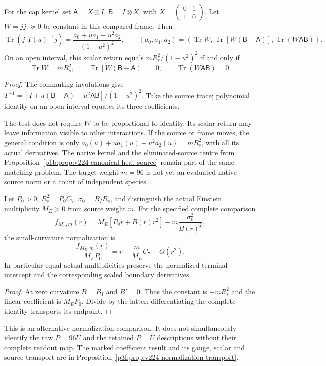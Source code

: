\documentclass[12pt,a4paper]{article}
\begin{document}
\begin{proposition}
\label{p3e:prop:v224-source-moments}
For the cap kernel set $\mathsf A=X\otimes I$,
$\mathsf B=I\otimes X$, with
$X=\left(\begin{smallmatrix}0&1\\1&0\end{smallmatrix}\right)$.
Let $W=jj^\dagger\succeq0$ be constant in this compared frame. Then
\[
 \operatorname{Tr}(j^\dagger T(u)^{-1}j)
 =\frac{a_0+ua_1-u^2a_2}{(1-u^2)^2},\qquad
 (a_0,a_1,a_2)=
 (\operatorname{Tr}W,\operatorname{Tr}[W(\mathsf B-\mathsf A)],
                              \operatorname{Tr}(W\mathsf A\mathsf B)).
\]
On an open interval, this scalar return equals
$mR_s^2/(1-u^2)^2$ if and only if
\[
 \operatorname{Tr}W=mR_s^2,\qquad
 \operatorname{Tr}[W(\mathsf B-\mathsf A)]=0,\qquad
 \operatorname{Tr}(W\mathsf A\mathsf B)=0.
\]
\end{proposition}
\begin{proof}
The commuting involutions give
$T^{-1}=[I+u(\mathsf B-\mathsf A)-u^2\mathsf A\mathsf B]/(1-u^2)^2$.
Take the source trace; polynomial identity on an open interval equates
its three coefficients.
\end{proof}
The test does not require $W$ to be proportional to identity. Its scalar
return may leave information visible to other interactions. If the source
or frame moves, the general condition is only
$a_0(u)+ua_1(u)-u^2a_2(u)=mR_s^2$, with all its actual derivatives.
The native kernel and the eliminated-source centre from
Proposition~\ref{p1b:prop:v224-canonical-heat-source} remain part of the
same matching problem. The target weight $m=96$ is not yet an evaluated
native source norm or a count of independent species.

\begin{proposition}
\label{p3e:prop:v224-common-multiplicity}
Let $P_0>0$, $R_s^2=P_0C_7$, $\sigma_0=B_IR_s$, and distinguish
the actual Einstein multiplicity $M_E>0$ from source weight $m$.
For the specified complete comparison
\[
 f_{M_E,m}(r)=M_E[P_0r+B(r)r^2]
                         -m\frac{\sigma_0^2}{B(r)^2},
\]
the small-curvature normalization is
\[
 \frac{f_{M_E,m}(r)}{M_EP_0}
             =r-\frac m{M_E}C_7+O(r^2).
\]
In particular equal actual multiplicities preserve the normalized
terminal intercept and the corresponding scaled boundary derivatives.
\end{proposition}
\begin{proof}
At zero curvature $B=B_I$ and $B'=0$. Thus the constant is
$-mR_s^2$ and the linear coefficient is $M_EP_0$. Divide by
the latter; differentiating the complete identity transports its endpoint.
\end{proof}
This is an alternative normalization comparison. It does not simultaneously
identify the raw $P=96U$ and the retained $P=U$ descriptions without
their complete readout map. The marked coefficient result and its gauge,
scalar and source transport are in Proposition~\ref{p3f:prop:v224-normalization-transport}.
\end{document}
